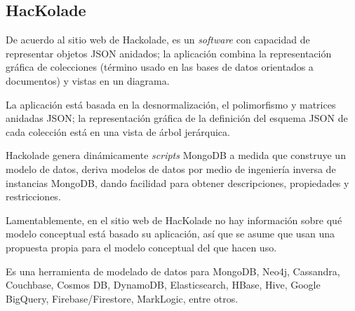 \subsection{HacKolade}
De acuerdo al sitio web de Hackolade\cite{hackolade_hackolade_2020}, es un \textit{software} con capacidad de representar objetos JSON anidados; la aplicación combina la representación gráfica de colecciones (término usado en las bases de datos orientados a documentos) y vistas en un diagrama.


La aplicación está basada en la desnormalización, el polimorfismo y matrices anidadas JSON; la representación gráfica de la definición del esquema JSON de cada colección está en una vista de árbol jerárquica. 


Hackolade genera dinámicamente \textit{scripts} MongoDB a medida que construye un modelo de datos, deriva modelos de datos por medio de ingeniería inversa de instancias MongoDB, dando facilidad para obtener descripciones, propiedades y restricciones.


Lamentablemente, en el sitio web de HacKolade no hay información sobre qué modelo conceptual está basado su aplicación, así que se asume que usan una propuesta propia para el modelo conceptual del que hacen uso.


Es una herramienta de modelado de datos para MongoDB, Neo4j, Cassandra, Couchbase, Cosmos DB, DynamoDB, Elasticsearch, HBase, Hive, Google BigQuery, Firebase/Firestore, MarkLogic, entre otros.
